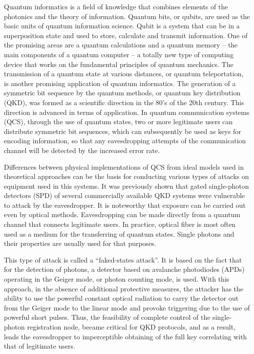 
  {\relevance} 
  Quantum informatics is a field of knowledge that combines elements of the photonics and the theory of information. Quantum bits, or qubits, are used as the basic units of quantum information science. Qubit is a system that can be in a superposition state and used to store, calculate and transmit information. One of the promising areas are a quantum calculations and a quantum memory -- the main components of a quantum computer -- a totally new type of computing device that works on the fundamental principles of quantum mechanics. The transmission of a quantum state at various distances, or quantum teleportation, is another promising application of quantum informatics. The generation of a symmetric bit sequence by the quantum methods, or quantum key distribution (QKD), was formed as a scientific direction in the 80's of the 20th century. This direction is advanced in terms of application. In quantum communication systems (QCS), through the use of quantum states, two or more legitimate users can distribute symmetric bit sequences, which can subsequently be used as keys for encoding information, so that any eavesdropping attempts of the communication channel will be detected by the increased error rate.
  
Differences between physical implementations of QCS from ideal models used in theoretical approaches can be the basis for conducting various types of attacks on equipment used in this systems. It was previously shown that gated single-photon detectors (SPD) of several commercially available QKD systems were vulnerable to attack by the eavesdropper. It is noteworthy that exposure can be carried out even by optical methods. Eavesdropping can be made directly from a quantum channel that connects legitimate users. In practice, optical fiber is most often used as a medium for the transferring of quantum states. Single photons and their properties are usually used for that purposes.
	
This type of attack is called a “faked-states attack”. It is based on the fact that for the detection of photons, a detector based on avalanche photodiodes (APDs) operating in the Geiger mode, or photon counting mode, is used. With this approach, in the absence of additional protective measures, the attacker has the ability to use the powerful constant optical radiation to carry the detector out from the Geiger mode to the linear mode and provoke triggering due to the use of powerful short pulses. Thus, the feasibility of complete control of the single-photon registration node, became critical for QKD protocols, and as a result, leads the eavesdropper to imperceptible obtaining of the full key correlating with that of legitimate users.
	

